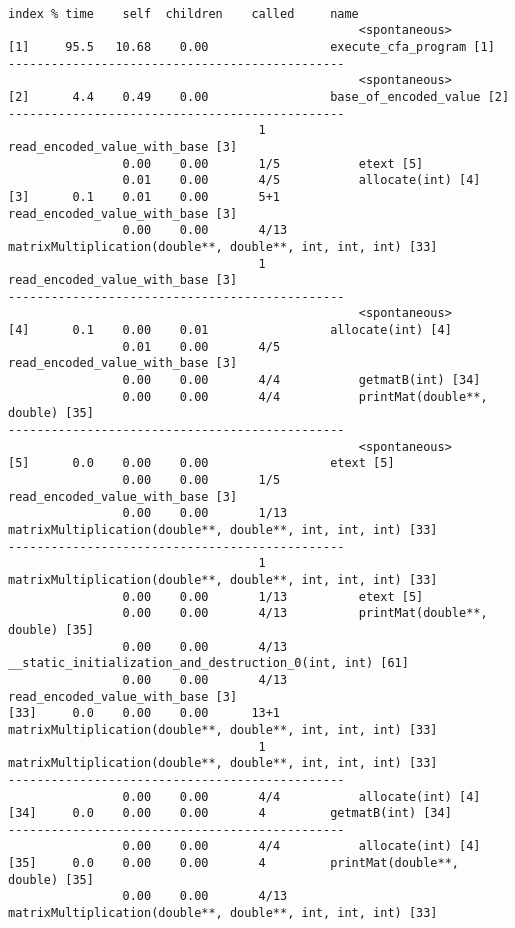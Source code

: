 \documentclass[7pt]{article}
\begin{document}
\begin{verbatim}

index % time    self  children    called     name
                                                 <spontaneous>
[1]     95.5   10.68    0.00                 execute_cfa_program [1]
-----------------------------------------------
                                                 <spontaneous>
[2]      4.4    0.49    0.00                 base_of_encoded_value [2]
-----------------------------------------------
                                   1             read_encoded_value_with_base [3]
                0.00    0.00       1/5           etext [5]
                0.01    0.00       4/5           allocate(int) [4]
[3]      0.1    0.01    0.00       5+1       read_encoded_value_with_base [3]
                0.00    0.00       4/13          matrixMultiplication(double**, double**, int, int, int) [33]
                                   1             read_encoded_value_with_base [3]
-----------------------------------------------
                                                 <spontaneous>
[4]      0.1    0.00    0.01                 allocate(int) [4]
                0.01    0.00       4/5           read_encoded_value_with_base [3]
                0.00    0.00       4/4           getmatB(int) [34]
                0.00    0.00       4/4           printMat(double**, double) [35]
-----------------------------------------------
                                                 <spontaneous>
[5]      0.0    0.00    0.00                 etext [5]
                0.00    0.00       1/5           read_encoded_value_with_base [3]
                0.00    0.00       1/13          matrixMultiplication(double**, double**, int, int, int) [33]
-----------------------------------------------
                                   1             matrixMultiplication(double**, double**, int, int, int) [33]
                0.00    0.00       1/13          etext [5]
                0.00    0.00       4/13          printMat(double**, double) [35]
                0.00    0.00       4/13          __static_initialization_and_destruction_0(int, int) [61]
                0.00    0.00       4/13          read_encoded_value_with_base [3]
[33]     0.0    0.00    0.00      13+1       matrixMultiplication(double**, double**, int, int, int) [33]
                                   1             matrixMultiplication(double**, double**, int, int, int) [33]
-----------------------------------------------
                0.00    0.00       4/4           allocate(int) [4]
[34]     0.0    0.00    0.00       4         getmatB(int) [34]
-----------------------------------------------
                0.00    0.00       4/4           allocate(int) [4]
[35]     0.0    0.00    0.00       4         printMat(double**, double) [35]
                0.00    0.00       4/13          matrixMultiplication(double**, double**, int, int, int) [33]

\end{verbatim}
\end{document}
